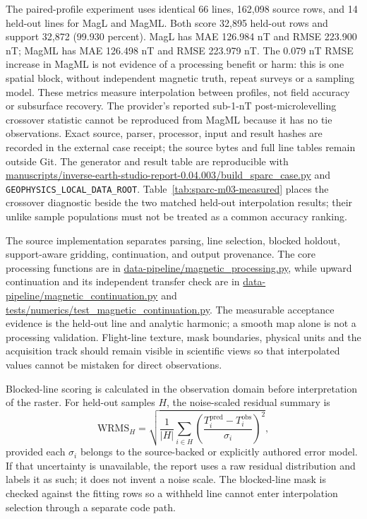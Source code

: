 The paired-profile experiment uses identical 66 lines, 162,098 source rows,
and 14 held-out lines for MagL and MagML. Both score 32,895 held-out rows and
support 32,872 (99.930 percent). MagL has MAE 126.984 nT and RMSE 223.900 nT;
MagML has MAE 126.498 nT and RMSE 223.979 nT. The 0.079 nT RMSE increase in
MagML is not evidence of a processing benefit or harm: this is one spatial
block, without independent magnetic truth, repeat surveys or a sampling model.
These metrics measure interpolation between profiles, not field accuracy or
subsurface recovery. The provider's reported sub-1-nT post-microlevelling
crossover statistic cannot be reproduced from MagML because it has no tie
observations. Exact source, parser, processor, input and result hashes are
recorded in the external case receipt; the source bytes and full line tables
remain outside Git. The generator and result table are reproducible with
\url{manuscripts/inverse-earth-studio-report-0.04.003/build_sparc_case.py}
and \texttt{GEOPHYSICS\_LOCAL\_DATA\_ROOT}. Table~\ref{tab:sparc-m03-measured}
places the crossover diagnostic beside the two matched held-out interpolation
results; their unlike sample populations must not be treated as a common
accuracy ranking.



The source implementation separates parsing, line selection, blocked
holdout, support-aware gridding, continuation, and output provenance.
The core processing functions are in
\url{data-pipeline/magnetic_processing.py}, while upward continuation
and its independent transfer check are in
\url{data-pipeline/magnetic_continuation.py} and
\url{tests/numerics/test_magnetic_continuation.py}. The measurable
acceptance evidence is the held-out line and analytic harmonic; a smooth
map alone is not a processing validation. Flight-line texture, mask
boundaries, physical units and the acquisition track should remain
visible in scientific views so that interpolated values cannot be
mistaken for direct observations.

Blocked-line scoring is calculated in the observation domain before
interpretation of the raster. For held-out samples $H$, the noise-scaled
residual summary is
\begin{equation}
  \mathrm{WRMS}_{H}=\sqrt{\frac{1}{|H|}\sum_{i\in H}
  \left(\frac{T_i^{\mathrm{pred}}-T_i^{\mathrm{obs}}}{\sigma_i}\right)^2},
  \label{eq:magnetic-blocked-wrms}
\end{equation}
provided each $\sigma_i$ belongs to the source-backed or explicitly
authored error model. If that uncertainty is unavailable, the report
uses a raw residual distribution and labels it as such; it does not
invent a noise scale. The blocked-line mask is checked against the
fitting rows so a withheld line cannot enter interpolation selection
through a separate code path.


